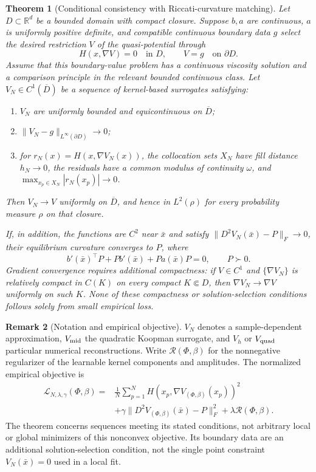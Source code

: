 \documentclass[11pt]{article}
\theoremstyle{plain}      %
\newtheorem{theorem}{Theorem}[section]     %
\theoremstyle{definition} %
\newtheorem{remark}[theorem]{Remark}
\begin{document}
\begin{theorem}[Conditional consistency with Riccati-curvature matching]\label{thm:consistency-curvature}
Let $D\subset\mathbb R^d$ be a bounded domain with compact closure. Suppose $b,a$ are continuous, $a$ is uniformly positive definite, and compatible continuous boundary data $g$ select the desired restriction $V$ of the quasi-potential through
\[
H(x,\nabla V)=0\quad\text{in }D,\qquad V=g\quad\text{on }\partial D.
\]
Assume that this boundary-value problem has a continuous viscosity solution and a comparison principle in the relevant bounded continuous class. Let $V_N\in C^1(\overline D)$ be a sequence of kernel-based surrogates satisfying:
\begin{enumerate}
\item $V_N$ are uniformly bounded and equicontinuous on $\overline D$;
\item $\|V_N-g\|_{L^\infty(\partial D)}\to0$;
\item for $r_N(x)=H(x,\nabla V_N(x))$, the collocation sets $X_N$ have fill distance $h_N\to0$, the residuals have a common modulus of continuity $\omega$, and $\max_{x_p\in X_N}|r_N(x_p)|\to0$.
\end{enumerate}
Then $V_N\to V$ uniformly on $\overline D$, and hence in $L^2(\rho)$ for every probability measure $\rho$ on that closure.

If, in addition, the functions are $C^2$ near $\bar x$ and satisfy
$\|D^2V_N(\bar x)-P\|_F\to0$, their equilibrium curvature converges to $P$, where
\[
 b'(\bar x)^\top P+P b'(\bar x)+P a(\bar x)P=0,\qquad P\succ0.
\]
Gradient convergence requires additional compactness: if $V\in C^1$ and $\{\nabla V_N\}$ is relatively compact in $C(K)$ on every compact $K\Subset D$, then $\nabla V_N\to\nabla V$ uniformly on such $K$. None of these compactness or solution-selection conditions follows solely from small empirical loss.
\end{theorem}

\begin{remark}[Notation and empirical objective]
$V_N$ denotes a sample-dependent approximation, $V_{\rm mid}$ the quadratic Koopman surrogate, and $V_h$ or $V_{\rm quad}$ particular numerical reconstructions. Write $\mathcal R(\Phi,\beta)$ for the nonnegative regularizer of the learnable kernel components and amplitudes. The normalized empirical objective is
\begin{equation}\label{eq:empirical-loss}
\begin{aligned}
\mathcal L_{N,\lambda,\gamma}(\Phi,\beta)
={}&\frac1N\sum_{p=1}^N H(x_p,\nabla V_{(\Phi,\beta)}(x_p))^2\\
&+\gamma\|D^2V_{(\Phi,\beta)}(\bar x)-P\|_F^2
+\lambda\mathcal R(\Phi,\beta).
\end{aligned}
\end{equation}
The theorem concerns sequences meeting its stated conditions, not arbitrary local or global minimizers of this nonconvex objective. Its boundary data are an additional solution-selection condition, not the single point constraint $V_N(\bar x)=0$ used in a local fit.
\end{remark}
\end{document}
